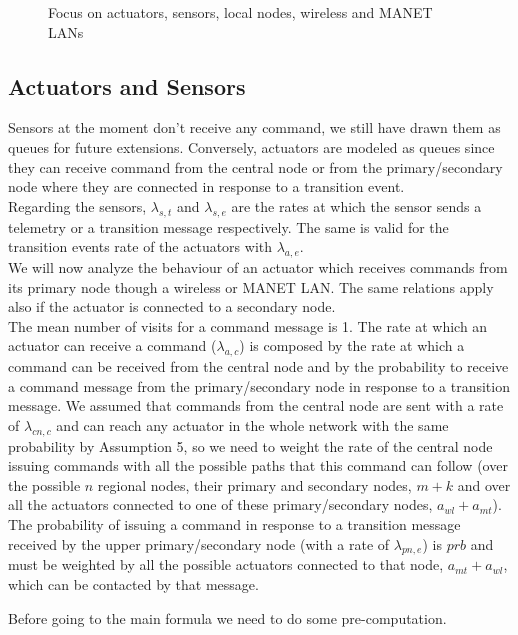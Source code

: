 \documentclass[11pt]{article}
\begin{document}
\begin{figure}[H]
	\centering
	\frame{}
	\caption{Focus on actuators, sensors,  local nodes, wireless and MANET LANs}
\end{figure}

\subsection{Actuators and Sensors}
Sensors at the moment don't receive any command, we still have drawn them as queues for future extensions. Conversely, actuators are modeled as queues since they can receive command from the central node or from the primary/secondary node where they are connected in response to a transition event.\\
Regarding the sensors, $\lambda_{s,t}$ and $\lambda_{s,e}$ are the rates at which the sensor sends a telemetry or a transition message respectively. The same is valid for the transition events rate of the actuators with $\lambda_{a,e}$.\\
We will now analyze the behaviour of an actuator which receives commands from its primary node though a wireless or MANET LAN. The same relations apply also if the actuator is connected to a secondary node.\\
The mean number of visits for a command message is 1.
The rate at which an actuator can receive a command ($\lambda_{a,c}$) is composed by the rate at which a command can be received from the central node and by the probability to receive a command message from the primary/secondary node in response to a transition message. We assumed that commands from the central node are sent with a rate of $\lambda_{cn,c}$ and can reach any actuator in the whole network with the same probability by Assumption 5, so we need to weight the rate of the central node issuing commands with all the possible paths that this command can follow (over the possible $n$ regional nodes, their primary and secondary nodes, $m+k$ and over all the actuators connected to one of these primary/secondary nodes, $a_{wl}+a_{mt}$). The probability of issuing a command in response to a transition message received by the upper primary/secondary node (with a rate of $\lambda_{pn,e}$) is $prb$ and must be weighted by all the possible actuators connected to that node, $a_{mt}+a_{wl}$, which can be contacted by that message.


Before going to the main formula we need to do some pre-computation.
\end{document}
